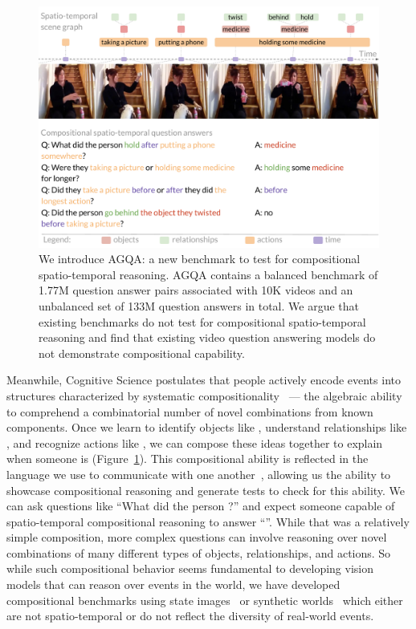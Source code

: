\begin{figure}[t]
    \centering
    \includegraphics[width=\columnwidth]{figures/pull.pdf}
    \caption{We introduce AGQA: a new benchmark to test for compositional spatio-temporal reasoning. AGQA contains a balanced benchmark of 1.77M question answer pairs associated with 10K videos and an unbalanced set of 133M question answers in total. We argue that existing benchmarks do not test for compositional spatio-temporal reasoning and find that existing video question answering models do not demonstrate compositional capability.}
    \label{fig:pull}
\end{figure}

Meanwhile, Cognitive Science postulates that people actively encode events into structures characterized by systematic compositionality~\cite{michotte2017perception,barker1951one,zacks2001perceiving} --- the algebraic ability to comprehend a combinatorial number of novel combinations from known components. Once we learn to identify objects like , understand relationships like , and recognize actions like , we can compose these ideas together to explain when someone is      (Figure~\ref{fig:pull}). This compositional ability is reflected in the language we use to communicate with one another~\cite{chomsky2002syntactic,montague1970universal}, allowing us the ability to showcase compositional reasoning and generate tests to check for this ability. We can ask questions like ``What did the person   ?'' and expect someone capable of spatio-temporal compositional reasoning to answer ``''. While
that was a relatively simple composition, more complex questions can involve reasoning over novel combinations of many different types of objects, relationships, and actions. So while such compositional behavior seems fundamental to developing vision models that can reason over events in the world, we have developed compositional benchmarks using state images~\cite{hudson2019gqa} or synthetic worlds~\cite{lake2018generalization,yi2019clevrer} which either are not spatio-temporal or do not reflect the diversity of real-world events.

